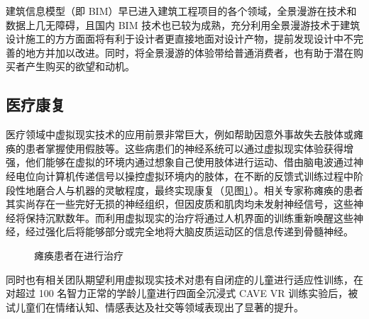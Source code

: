 建筑信息模型（即 BIM）早已进入建筑工程项目的各个领域，全景漫游在技术和数据上几无障碍，且国内 BIM 技术也已较为成熟，充分利用全景漫游技术于建筑设计施工的方方面面将有利于设计者更直接地面对设计产物，提前发现设计中不完善的地方并加以改进。同时，将全景漫游的体验带给普通消费者，也有助于潜在购买者产生购买的欲望和动机。

\subsection{医疗康复}

医疗领域中虚拟现实技术的应用前景非常巨大，例如帮助因意外事故失去肢体或瘫痪的患者掌握使用假肢等。这些病患们的神经系统可以通过虚拟现实体验获得增强，他们能够在虚拟的环境内通过想象自己使用肢体进行运动、借由脑电波通过神经电位向计算机传递信号以操控虚拟环境内的肢体，在不断的反馈式训练过程中阶段性地磨合人与机器的灵敏程度，最终实现康复（见图\ref{fig:health}）。相关专家称瘫痪的患者其实尚存在一些完好无损的神经组织，但因皮质和肌肉均未发射神经信号，这些神经将保持沉默数年。而利用虚拟现实的治疗将通过人机界面的训练重新唤醒这些神经，经过强化后将能够部分或完全地将大脑皮质运动区的信息传递到骨髓神经。

\begin{figure}[htp]
\centering
{}
\caption{瘫痪患者在进行治疗}
\label{fig:health}
\end{figure}

同时也有相关团队期望利用虚拟现实技术对患有自闭症的儿童进行适应性训练，在对超过 100 名智力正常的学龄儿童进行四面全沉浸式 CAVE VR 训练实验后，被试儿童们在情绪认知、情感表达及社交等领域表现出了显著的提升。
